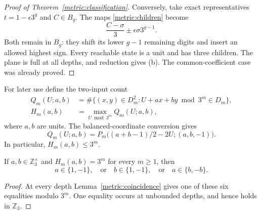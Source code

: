 \begin{proof}[Proof of Theorem~\ref{metric:classification}]
Conversely, take exact representatives $t=1-\epsilon3^g$ and
$C\in B_g$. The maps \eqref{metric:children} become
\[
           \frac{C-\sigma}{3}\mathbin{\pm}\epsilon\sigma3^{g-1}.
\]
Both remain in $B_g$: they shift its lower $g-1$ remaining digits
and insert an allowed highest sign. Every reachable state is a unit
and has three children. The plane is full at all depths, and reduction
gives (b). The common-coefficient case was already proved.
\end{proof}

For later use define the two-input count
\begin{equation}\label{metric:Q}
 \begin{aligned}
 Q_m(U;a,b)&=\#\{(x,y)\in D_m^2:
                     U+ax+by\bmod3^m\in D_m\},\\
 H_m(a,b)&=\max_{U\bmod3^m}Q_m(U;a,b),
 \end{aligned}
\end{equation}
where $a,b$ are units. The balanced-coordinate conversion gives
\begin{equation}\label{metric:conversion}
 Q_m(U;a,b)=P_m\bigl((a+b-1)/2-2U;(a,b,-1)\bigr).
\end{equation}
In particular, $H_m(a,b)\leq3^m$.

\begin{corollary}\label{metric:inverse}
If $a,b\in\mathbb Z_3^\times$ and $H_m(a,b)=3^m$ for every
$m\geq1$, then
\[
                   a\in\{1,-1\},\quad\text{or}\quad
                   b\in\{1,-1\},\quad\text{or}\quad a\in\{b,-b\}.
\]
\end{corollary}
\begin{proof}
At every depth Lemma~\ref{metric:coincidence} gives one of these six
equalities modulo $3^m$. One equality occurs at unbounded depths,
and hence holds in $\mathbb Z_3$.
\end{proof}

